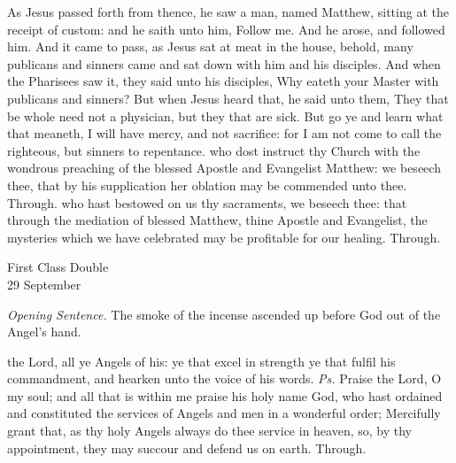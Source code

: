 
 As Jesus passed forth from thence, he saw a man, named Matthew, sitting at the receipt of custom: and he saith unto him, Follow me. And he arose, and followed him. And it came to pass, as Jesus sat at meat in the house, behold, many publicans and sinners came and sat down with him and his disciples. And when the Pharisees saw it, they said unto his disciples, Why eateth your Master with publicans and sinners? But when Jesus heard that, he said unto them, They that be whole need not a physician, but they that are sick. But go ye and learn what that meaneth, I will have mercy, and not sacrifice: for I am not come to call the righteous, but sinners to repentance.
\secret
{} who dost instruct thy Church with the wondrous preaching of the blessed Apostle and Evangelist Matthew: we beseech thee, that by his supplication her oblation may be commended unto thee. Through.
\postcommunion
{} who hast bestowed on us thy sacraments, we beseech thee: that through the mediation of blessed Matthew, thine Apostle and Evangelist, the mysteries which we have celebrated may be profitable for our healing. Through.


\clearpage
{}
\begin{inhead}
    {First Class Double\\
29 September}
\end{inhead}
\par\noindent
\textit{Opening Sentence.} The smoke of the incense ascended up before God out of the Angel's hand.

\introit
{} the Lord, all ye Angels of his: ye that excel in strength ye that fulfil his commandment, and hearken unto the voice of his words. \textit{Ps.} Praise the Lord, O my soul; and all that is within me praise his holy name
\collect
{} God, who hast ordained and constituted the services of Angels and men in a wonderful order; Mercifully grant that, as thy holy Angels always do thee service in heaven, so, by thy appointment, they may succour and defend us on earth. Through.

